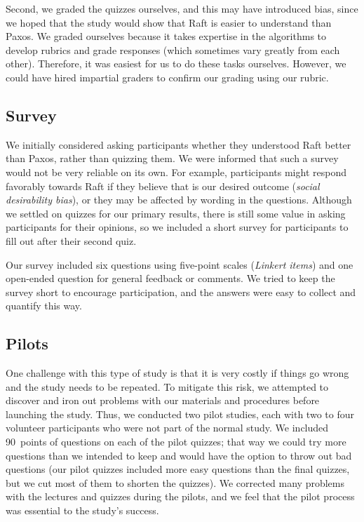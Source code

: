 Second, we graded the quizzes ourselves, and this may have introduced
bias, since we hoped that the study would show that Raft is easier to
understand than Paxos. We graded ourselves because it
takes expertise in the algorithms to develop rubrics and grade responses
(which sometimes vary greatly from each other). Therefore, it was
easiest for us to do these tasks ourselves. However, we could have hired
impartial graders to confirm our grading using our rubric.


\subsection{Survey}
\label{userstudy:methodsdiscussion:survey}

We initially considered asking participants whether they understood Raft
better than Paxos, rather than quizzing them. We were informed that such
a survey would not be very reliable on its own. For example,
participants might respond favorably towards Raft if they believe that
is our desired outcome (\emph{social desirability bias}), or they may be affected by
wording in the questions. Although we settled on quizzes
for our primary results, there is still some value in
asking participants for their opinions, so we included a short survey
for participants to fill out after their second quiz.

Our survey included six questions using five-point scales (\emph{Linkert
items}) and one open-ended question for general feedback or comments. We
tried to keep the survey short to encourage participation, and the
answers were easy to collect and quantify this way.

\subsection{Pilots}
\label{userstudy:methodsdiscussion:pilots}

One challenge with this type of study is that it is very costly if
things go wrong and the study needs to be repeated. To mitigate this
risk, we attempted to discover and iron out problems with our materials
and procedures before launching the study. Thus, we conducted two pilot
studies, each with two to four volunteer participants who were not part
of the normal study.
We included \SI{90}{points} of questions on each of
the pilot quizzes; that way we could try more questions than we intended
to keep and would have the option to throw out bad questions
(our pilot quizzes included more easy questions than the final quizzes,
but we cut most of them to shorten the quizzes).
We corrected many
problems with the lectures and quizzes during the pilots, and we
feel that the pilot process was essential to the study's success.

